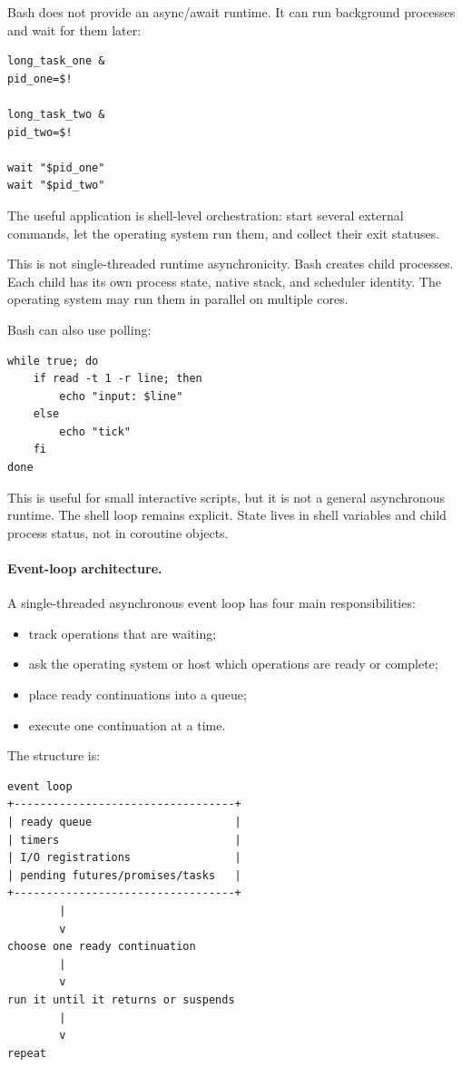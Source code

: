 Bash does not provide an async/await runtime. It can run background processes and wait for them later:

\begin{verbatim}
long_task_one &
pid_one=$!

long_task_two &
pid_two=$!

wait "$pid_one"
wait "$pid_two"
\end{verbatim}

The useful application is shell-level orchestration: start several external commands, let the operating system run them, and collect their exit statuses.

This is not single-threaded runtime asynchronicity. Bash creates child processes. Each child has its own process state, native stack, and scheduler identity. The operating system may run them in parallel on multiple cores.

Bash can also use polling:

\begin{verbatim}
while true; do
    if read -t 1 -r line; then
        echo "input: $line"
    else
        echo "tick"
    fi
done
\end{verbatim}

This is useful for small interactive scripts, but it is not a general asynchronous runtime. The shell loop remains explicit. State lives in shell variables and child process status, not in coroutine objects.

\paragraph{Event-loop architecture.}

A single-threaded asynchronous event loop has four main responsibilities:

\begin{itemize}
    \item track operations that are waiting;
    \item ask the operating system or host which operations are ready or complete;
    \item place ready continuations into a queue;
    \item execute one continuation at a time.
\end{itemize}

The structure is:

\begin{verbatim}
event loop
+----------------------------------+
| ready queue                      |
| timers                           |
| I/O registrations                |
| pending futures/promises/tasks   |
+----------------------------------+
        |
        v
choose one ready continuation
        |
        v
run it until it returns or suspends
        |
        v
repeat
\end{verbatim}

